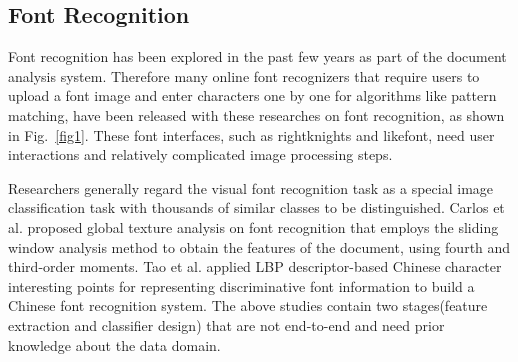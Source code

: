 \documentclass[manuscript,screen]{acmart}
\begin{document}
\subsection{Font Recognition}
Font recognition has been explored in the past few years as part of the document analysis system. Therefore many online font recognizers that require users to upload a font image and enter characters one by one for algorithms like pattern matching, have been released with these researches on font recognition, as shown in Fig.~\ref{fig1}. These font interfaces, such as rightknights and likefont, need user interactions and relatively complicated image processing steps. 

Researchers generally regard the visual font recognition task as a special image classification task with thousands of similar classes to be distinguished. Carlos et al. \cite{aviles-cruz_high-order_2005} proposed global texture analysis on font recognition that employs the sliding window analysis method to obtain the features of the document, using fourth and third-order moments. Tao et al. \cite{tao_sparse_2014} applied LBP descriptor-based Chinese character interesting points for representing discriminative font information to build a Chinese font recognition system. The above studies contain two stages(feature extraction and classifier design) that are not end-to-end and need prior knowledge about the data domain.
\end{document}
